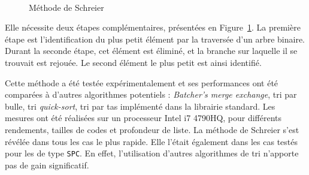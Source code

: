 \begin{figure}[t]
\centering
{}
\\
\caption{Méthode de Schreier}
\label{fig:schreier_sort}
\end{figure}
Elle nécessite deux étapes complémentaires, présentées en Figure~\ref{fig:schreier_sort}. La première étape est l'identification du plus petit élément par la traversée d'un arbre binaire. Durant la seconde étape, cet élément est éliminé, et la branche sur laquelle il se trouvait est rejouée. Le second élément le plus petit est ainsi identifié.


Cette méthode a été testée expérimentalement et ses performances ont été comparées à d'autres algorithmes potentiels : \textit{Batcher's merge exchange}, tri par bulle, tri \textit{quick-sort}, tri par tas implémenté dans la librairie standard. Les mesures ont été réalisées sur un processeur Intel i7 4790HQ, pour différents rendements, tailles de codes et profondeur de liste. La méthode de Schreier s'est révélée dans tous les cas le plus rapide. Elle l'était également dans les cas testés pour les \noeuds de type \texttt{SPC}. En effet, l'utilisation d'autres algorithmes de tri n'apporte pas de gain significatif.

